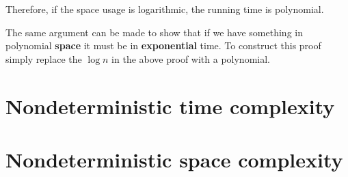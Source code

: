 \documentclass{article}
\begin{document}
  Therefore, if the space usage is logarithmic, the running time is polynomial.

  The same argument can be made to show that if we have something in polynomial \textbf{space} it must be in \textbf{exponential } time. To construct this proof simply replace the $\log n$ in the above proof with a polynomial.


\section{Nondeterministic time complexity}

\section{Nondeterministic space complexity}
\end{document}
